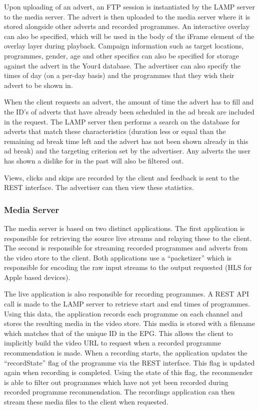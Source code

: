 Upon uploading of an advert, an FTP session is instantiated by the LAMP server to the media server. The advert is then uploaded to the media server where it is stored alongside other adverts and recorded programmes. An interactive overlay can also be specified, which will be used in the body of the iFrame element of the overlay layer during playback. Campaign information such as target locations, programmes, gender, age and other specifics can also be specified for storage against the advert in the Your4 database. The advertiser can also specify the times of day (on a per-day basis) and the programmes that they wish their advert to be shown in.

When the client requests an advert, the amount of time the advert has to fill and the ID's of adverts that have already been scheduled in the ad break are included in the request. The LAMP server then performs a search on the database for adverts that match these characteristics (duration less or equal than the remaining ad break time left and the advert has not been shown already in this ad break) and the targeting criterion set by the advertiser. Any adverts the user has shown a dislike for in the past will also be filtered out.

Views, clicks and skips are recorded by the client and feedback is sent to the REST interface. The advertiser can then view these statistics.

\subsubsection{Media Server}

The media server is based on two distinct applications. The first application is responsible for retrieving the source live streams and relaying these to the client. The second is responsible for streaming recorded programmes and adverts from the video store to the client. Both applications use a ``packetizer'' which is responsible for encoding the raw input streams to the output requested (HLS for Apple based devices).

The live application is also responsible for recording programmes. A REST API call is made to the LAMP server to retrieve start and end times of programmes. Using this data, the application records each programme on each channel and stores the resulting media in the video store. This media is stored with a filename which matches that of the unique ID in the EPG. This allows the client to implicitly build the video URL to request when a recorded programme recommendation is made. When a recording starts, the application updates the ``recordState'' flag of the programme via the REST interface. This flag is updated again when recording is completed. Using the state of this flag, the recommender is able to filter out programmes which have not yet been recorded during recorded programme recommendation. The recordings application can then stream these media files to the client when requested.

